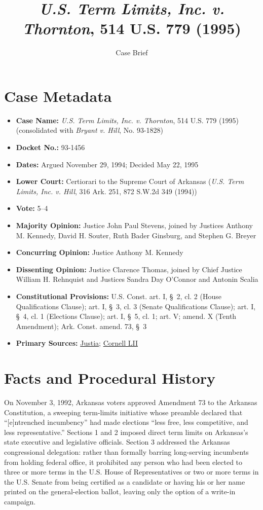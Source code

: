 \documentclass[12pt]{article}
\title{\textit{U.S. Term Limits, Inc. v. Thornton}, 514 U.S. 779 (1995)}
\author{Case Brief}
\date{}
\begin{document}
\maketitle

\section{Case Metadata}

\begin{itemize}
    \item \textbf{Case Name:} \textit{U.S. Term Limits, Inc. v. Thornton}, 514 U.S. 779 (1995) (consolidated with \textit{Bryant v. Hill}, No. 93-1828)
    \item \textbf{Docket No.:} 93-1456
    \item \textbf{Dates:} Argued November 29, 1994; Decided May 22, 1995
    \item \textbf{Lower Court:} Certiorari to the Supreme Court of Arkansas (\textit{U.S. Term Limits, Inc. v. Hill}, 316 Ark. 251, 872 S.W.2d 349 (1994))
    \item \textbf{Vote:} 5--4
    \item \textbf{Majority Opinion:} Justice John Paul Stevens, joined by Justices Anthony M. Kennedy, David H. Souter, Ruth Bader Ginsburg, and Stephen G. Breyer
    \item \textbf{Concurring Opinion:} Justice Anthony M. Kennedy
    \item \textbf{Dissenting Opinion:} Justice Clarence Thomas, joined by Chief Justice William H. Rehnquist and Justices Sandra Day O'Connor and Antonin Scalia
    \item \textbf{Constitutional Provisions:} U.S. Const. art. I, \S~2, cl. 2 (House Qualifications Clause); art. I, \S~3, cl. 3 (Senate Qualifications Clause); art. I, \S~4, cl. 1 (Elections Clause); art. I, \S~5, cl. 1; art. V; amend. X (Tenth Amendment); Ark. Const. amend. 73, \S~3
    \item \textbf{Primary Sources:} \href{https://supreme.justia.com/cases/federal/us/514/779/}{Justia}; \href{https://www.law.cornell.edu/supremecourt/text/514/779}{Cornell LII}
\end{itemize}

\section{Facts and Procedural History}

On November 3, 1992, Arkansas voters approved Amendment 73 to the Arkansas Constitution, a sweeping term-limits initiative whose preamble declared that ``[e]ntrenched incumbency'' had made elections ``less free, less competitive, and less representative.'' Sections 1 and 2 imposed direct term limits on Arkansas's state executive and legislative officials. Section 3 addressed the Arkansas congressional delegation: rather than formally barring long-serving incumbents from holding federal office, it prohibited any person who had been elected to three or more terms in the U.S. House of Representatives or two or more terms in the U.S. Senate from being certified as a candidate or having his or her name printed on the general-election ballot, leaving only the option of a write-in campaign.
\end{document}
